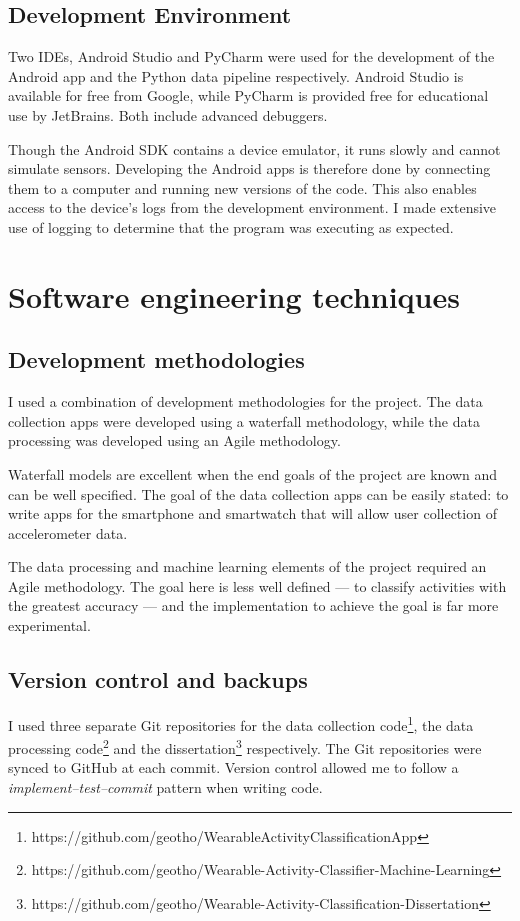     \subsection{Development Environment}
      Two IDEs, Android Studio and PyCharm were used for the development of the Android app and the Python data pipeline respectively. Android Studio is available for free from Google, while PyCharm is provided free for educational use by JetBrains. Both include advanced debuggers.
      
      Though the Android SDK contains a device emulator, it runs slowly and cannot simulate sensors. Developing the Android apps is therefore done by connecting them to a computer and running new versions of the code. This also enables access to the device's logs from the development environment. I made extensive use of logging to determine that the program was executing as expected.
  \section{Software engineering techniques}
    \subsection{Development methodologies}
      I used a combination of development methodologies for the project. The data collection apps were developed using a waterfall methodology, while the data processing was developed using an Agile methodology.
      
      Waterfall models are excellent when the end goals of the project are known and can be well specified. The goal of the data collection apps can be easily stated: to write apps for the smartphone and smartwatch that will allow user collection of accelerometer data.
      
      The data processing and machine learning elements of the project required an Agile methodology. The goal here is less well defined --- to classify activities with the greatest accuracy --- and the implementation to achieve the goal is far more experimental.
      
    \subsection{Version control and backups}
      I used three separate Git repositories for the data collection code\footnote{https://github.com/geotho/WearableActivityClassificationApp}, the data processing code\footnote{https://github.com/geotho/Wearable-Activity-Classifier-Machine-Learning} and the dissertation\footnote{https://github.com/geotho/Wearable-Activity-Classification-Dissertation} respectively. The Git repositories were synced to GitHub at each commit. Version control allowed me to follow a \emph{implement--test--commit} pattern when writing code. 
      
